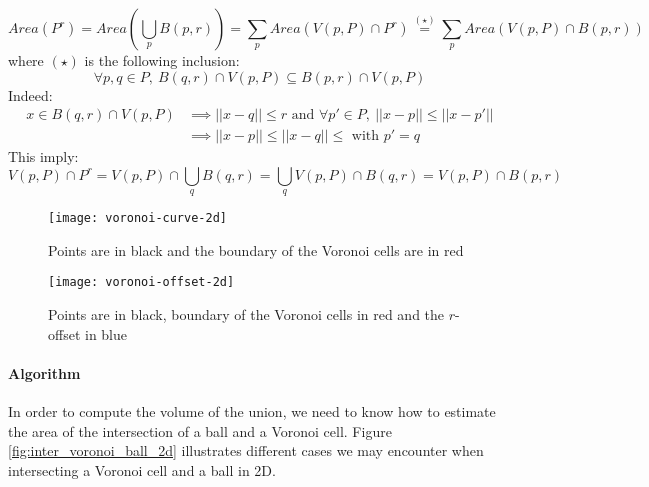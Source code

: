 \begin{equation}
    Area(P^r) = Area \left( \bigcup_p B(p, r) \right) = \sum_p Area(V(p, P)
    \cap P^r) \stackrel{(\star)}{=} \sum_p Area(V(p, P) \cap B(p, r))
    \label{eqn:area-union-balls}
\end{equation}
where $ (\star) $ is the following inclusion:
$$ \forall p, q \in P,~ B(q, r) \cap V(p, P) \subseteq B(p, r) \cap V(p, P) $$
Indeed:
\begin{align*}
    x \in B(q, r) \cap V(p, P) & \implies || x - q || \leq r \text{ and } \forall
    p' \in P,~ || x - p || \leq || x - p' || \\
    & \implies || x - p || \leq || x - q || \leq \text { with } p' = q
\end{align*}
This imply:
$$
V(p, P) \cap P^r = V(p, P) \cap \bigcup_q B(q, r) = \bigcup_q V(p, P) \cap B(q,
r) = V(p, P) \cap B(p, r)
$$

\begin{figure}[h]
    \centering
    \texttt{[image: voronoi-curve-2d]}
    \caption{Points are in black and the boundary of the Voronoi cells are in
        red}
    \label{fig:voronoi-diagram-2d}
\end{figure}

\begin{figure}[h]
    \centering
    \texttt{[image: voronoi-offset-2d]}
    \caption{Points are in black, boundary of the Voronoi cells in red and the
        $r$-offset in blue}
    \label{fig:voronoi-offset-2d}
\end{figure}

\paragraph{Algorithm}

In order to compute the volume of the union, we need to know how to estimate the
area of the intersection of a ball and a Voronoi cell. Figure
\ref{fig:inter_voronoi_ball_2d} illustrates different cases we may encounter
when intersecting a Voronoi cell and a ball in 2D.

